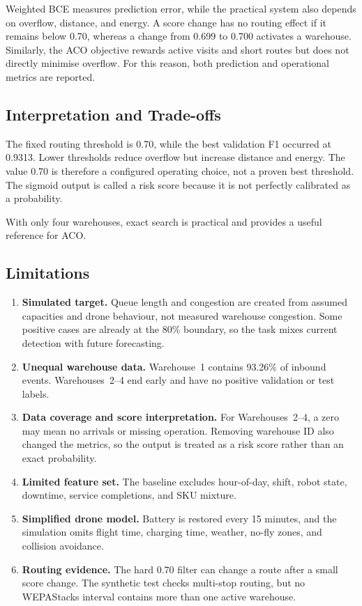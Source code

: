 \documentclass[10pt]{article}
\begin{document}
Weighted BCE measures prediction error, while the practical system also depends on overflow, distance, and energy. A score change has no routing effect if it remains below 0.70, whereas a change from 0.699 to 0.700 activates a warehouse. Similarly, the ACO objective rewards active visits and short routes but does not directly minimise overflow. For this reason, both prediction and operational metrics are reported.

\subsection{Interpretation and Trade-offs}

The fixed routing threshold is 0.70, while the best validation F1 occurred at 0.9313. Lower thresholds reduce overflow but increase distance and energy. The value 0.70 is therefore a configured operating choice, not a proven best threshold. The sigmoid output is called a risk score because it is not perfectly calibrated as a probability.

With only four warehouses, exact search is practical and provides a useful reference for ACO.

\subsection{Limitations}

\begin{enumerate}
  \item \textbf{Simulated target.} Queue length and congestion are created from assumed capacities and drone behaviour, not measured warehouse congestion. Some positive cases are already at the 80\% boundary, so the task mixes current detection with future forecasting.
  \item \textbf{Unequal warehouse data.} Warehouse~1 contains 93.26\% of inbound events. Warehouses~2--4 end early and have no positive validation or test labels.
  \item \textbf{Data coverage and score interpretation.} For Warehouses~2--4, a zero may mean no arrivals or missing operation. Removing warehouse ID also changed the metrics, so the output is treated as a risk score rather than an exact probability.
  \item \textbf{Limited feature set.} The baseline excludes hour-of-day, shift, robot state, downtime, service completions, and SKU mixture.
  \item \textbf{Simplified drone model.} Battery is restored every 15 minutes, and the simulation omits flight time, charging time, weather, no-fly zones, and collision avoidance.
  \item \textbf{Routing evidence.} The hard 0.70 filter can change a route after a small score change. The synthetic test checks multi-stop routing, but no WEPAStacks interval contains more than one active warehouse.
\end{enumerate}
\end{document}
